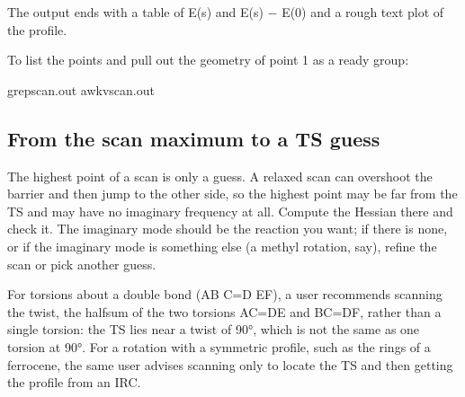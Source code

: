 \documentclass[letterpaper,10pt,english,openany,oneside]{sphinxmanual}
\begin{document}
\sphinxAtStartPar
The output ends with a table of E(s) and E(s) − E(0) and a rough text plot of the profile.



\sphinxAtStartPar
To list the points and pull out the geometry of point 1 as a ready  group:

\begin{sphinxVerbatim}[commandchars=\\\{\}]
grepscan.out
awk\PYGZhy{}vscan.out
\end{sphinxVerbatim}




\subsection{From the scan maximum to a TS guess}
\label{\detokenize{tasks/ts-irc-scan:from-the-scan-maximum-to-a-ts-guess}}
\sphinxAtStartPar
The highest point of a scan is only a guess. A relaxed scan can overshoot the barrier and then jump to the other
side, so the highest point may be far from the TS and may have no imaginary frequency at all. Compute the Hessian
there and check it. The imaginary mode should be the reaction you want; if there is none, or if the imaginary mode
is something else (a methyl rotation, say), refine the scan or pick another guess.



\sphinxAtStartPar
For torsions about a double bond (AB C=D EF), a user recommends scanning the twist, the half\sphinxhyphen{}sum of the two
torsions A\textendash{}C=D\textendash{}E and B\textendash{}C=D\textendash{}F, rather than a single torsion: the TS lies near a twist of 90°, which is not the same as
one torsion at 90°. For a rotation with a symmetric profile, such as the rings of a ferrocene, the same user advises
scanning only to locate the TS and then getting the profile from an IRC.
\end{document}

